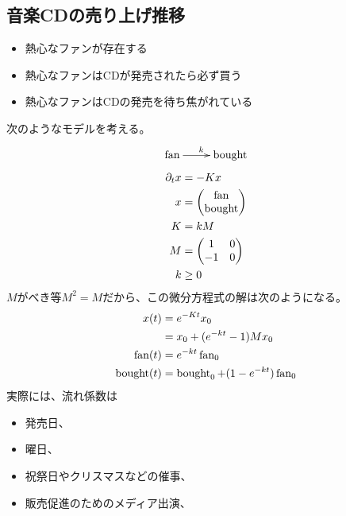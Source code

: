 \subsection{音楽CDの売り上げ推移}
\begin{itemize}
	\item 熱心なファンが存在する
	\item 熱心なファンはCDが発売されたら必ず買う
	\item 熱心なファンはCDの発売を待ち焦がれている
\end{itemize}
次のようなモデルを考える。
\begin{equation}\xymatrix{
	\myop{fan} \ar[r]^k & \myop{bought} \\
}\end{equation}
\begin{equation}\begin{split}
	\partial_tx &= -Kx \\
	x &= \begin{pmatrix}
		\operatorname{fan} \\
		\operatorname{bought} \\
		\end{pmatrix} \\
	K &= kM \\
	M &= \begin{pmatrix}
		1 & 0 \\
		- 1 & 0 \\
		\end{pmatrix} \\
	k &\ge 0 \\
\end{split}\end{equation}
$M$がべき等$M^2=M$だから、この微分方程式の解は次のようになる。
\begin{equation}\begin{split}
	x(t) &= e^{-Kt}x_0 \\
		&= x_0 + (e^{-kt}-1)Mx_0 \\
	\operatorname{fan}(t) &= e^{-kt}\operatorname{fan}_0 \\
	\operatorname{bought}(t) &= \operatorname{bought}_0 + (1 - e^{-kt})\operatorname{fan}_0 \\
\end{split}\end{equation}
実際には、流れ係数は
\begin{itemize}
	\item 発売日、
	\item 曜日、
	\item 祝祭日やクリスマスなどの催事、
	\item 販売促進のためのメディア出演、
\end{itemize}
